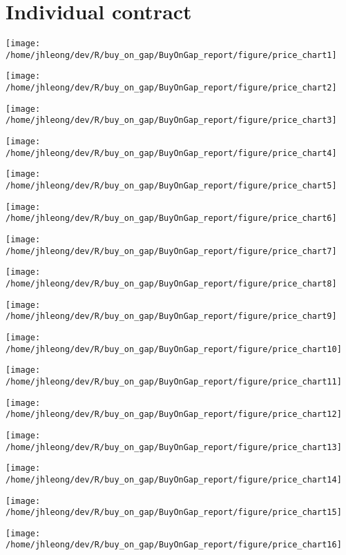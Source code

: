 \documentclass{tufte-handout}\usepackage[]{graphicx}\usepackage[]{color}
\makeatletter
\def\maxwidth{ %
  \ifdim\Gin@nat@width>\linewidth
    \linewidth
  \else
    \Gin@nat@width
  \fi
}
\newenvironment{knitrout}{}{} %
\makeatother
\begin{document}

\newpage
\section{Individual contract}
\begin{fullwidth}
\begin{knitrout}
\color{fgcolor}
\texttt{[image: /home/jhleong/dev/R/buy\_on\_gap/BuyOnGap\_report/figure/price\_chart1]} 

\texttt{[image: /home/jhleong/dev/R/buy\_on\_gap/BuyOnGap\_report/figure/price\_chart2]} 

\texttt{[image: /home/jhleong/dev/R/buy\_on\_gap/BuyOnGap\_report/figure/price\_chart3]} 

\texttt{[image: /home/jhleong/dev/R/buy\_on\_gap/BuyOnGap\_report/figure/price\_chart4]} 

\texttt{[image: /home/jhleong/dev/R/buy\_on\_gap/BuyOnGap\_report/figure/price\_chart5]} 

\texttt{[image: /home/jhleong/dev/R/buy\_on\_gap/BuyOnGap\_report/figure/price\_chart6]} 

\texttt{[image: /home/jhleong/dev/R/buy\_on\_gap/BuyOnGap\_report/figure/price\_chart7]} 

\texttt{[image: /home/jhleong/dev/R/buy\_on\_gap/BuyOnGap\_report/figure/price\_chart8]} 

\texttt{[image: /home/jhleong/dev/R/buy\_on\_gap/BuyOnGap\_report/figure/price\_chart9]} 

\texttt{[image: /home/jhleong/dev/R/buy\_on\_gap/BuyOnGap\_report/figure/price\_chart10]} 

\texttt{[image: /home/jhleong/dev/R/buy\_on\_gap/BuyOnGap\_report/figure/price\_chart11]} 

\texttt{[image: /home/jhleong/dev/R/buy\_on\_gap/BuyOnGap\_report/figure/price\_chart12]} 

\texttt{[image: /home/jhleong/dev/R/buy\_on\_gap/BuyOnGap\_report/figure/price\_chart13]} 

\texttt{[image: /home/jhleong/dev/R/buy\_on\_gap/BuyOnGap\_report/figure/price\_chart14]} 

\texttt{[image: /home/jhleong/dev/R/buy\_on\_gap/BuyOnGap\_report/figure/price\_chart15]} 

\texttt{[image: /home/jhleong/dev/R/buy\_on\_gap/BuyOnGap\_report/figure/price\_chart16]} 

\end{knitrout}


\end{fullwidth}
\end{document}

